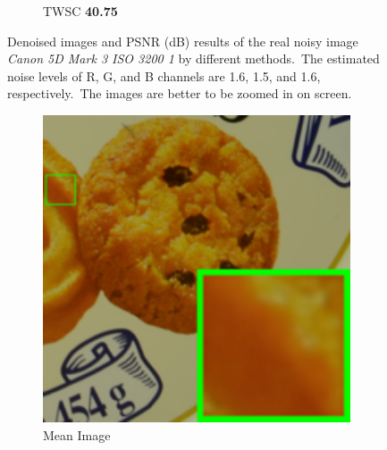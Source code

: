 \begin{figure}
\begin{subfigure}[t]{0.19\textwidth}
		\caption{TWSC \textbf{40.75}}
    \end{subfigure}
    \caption{Denoised images and PSNR (dB) results of the real noisy image \textsl{Canon 5D Mark 3 ISO 3200 1} \cite{crosschannel2016} by different methods.\ The estimated noise levels of R, G, and B channels are 1.6, 1.5, and 1.6, respectively.\ The images are better to be zoomed in on screen.}
    \label{fig5-11}
\end{figure}


\begin{figure}
    \centering
    \begin{subfigure}[t]{0.19\textwidth}
        \centering
        \includegraphics[width=1\textwidth]{images/twsc/cc/resize_br_Mean_d600_iso3200_2_real.png}
		\caption{Mean Image}
    \end{subfigure}
    \hfill
    \begin{subfigure}[t]{0.19\textwidth}
        \centering

\end{subfigure}
\end{figure}

